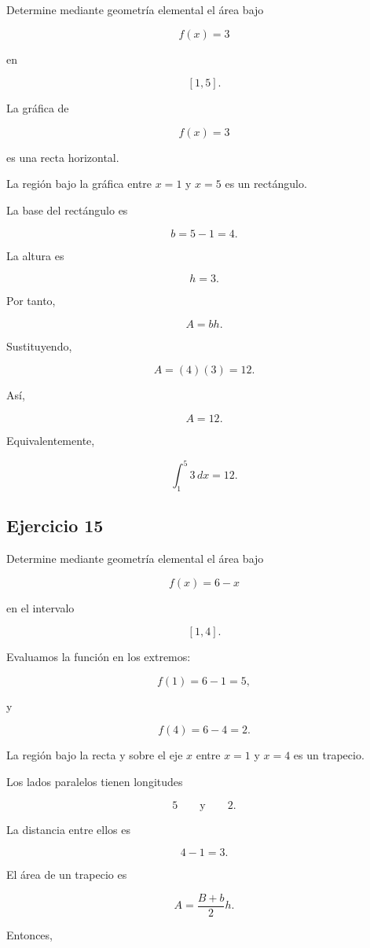 \documentclass[12pt]{article}
\begin{document}
Determine mediante geometría elemental el área bajo

\[
f(x)=3
\]

en

\[
[1,5].
\]

La gráfica de

\[
f(x)=3
\]

es una recta horizontal.

La región bajo la gráfica entre \(x=1\) y \(x=5\) es un rectángulo.

La base del rectángulo es

\[
b=5-1=4.
\]

La altura es

\[
h=3.
\]

Por tanto,

\[
A=bh.
\]

Sustituyendo,

\[
A=(4)(3)=12.
\]

Así,

\[
\boxed{A=12}.
\]

Equivalentemente,

\[
\int_1^5 3\,dx=12.
\]

\subsection*{Ejercicio 15}

Determine mediante geometría elemental el área bajo

\[
f(x)=6-x
\]

en el intervalo

\[
[1,4].
\]

Evaluamos la función en los extremos:

\[
f(1)=6-1=5,
\]

y

\[
f(4)=6-4=2.
\]

La región bajo la recta y sobre el eje \(x\) entre \(x=1\) y \(x=4\)
es un trapecio.

Los lados paralelos tienen longitudes

\[
5
\qquad\text{y}\qquad
2.
\]

La distancia entre ellos es

\[
4-1=3.
\]

El área de un trapecio es

\[
A=
\frac{B+b}{2}h.
\]

Entonces,
\end{document}
